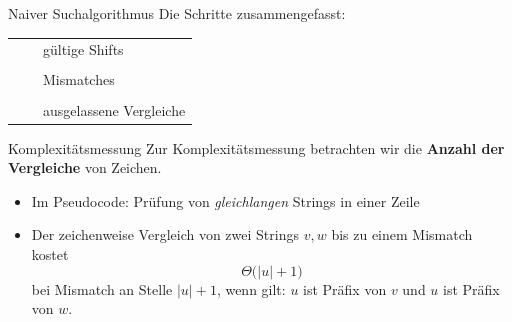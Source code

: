 \documentclass[xcolor=dvipsnames, aspectratio=1610]{beamer}
\begin{document}
\begin{frame}{Naiver Suchalgorithmus}
Die Schritte zusammengefasst:\bigskip

\begin{minipage}{.9\textwidth}
\begin{table}\setlength\extrarowheight{.3em}
\caption{Naiver Algorithmus, Beispiel}
\end{table}
\end{minipage}
\hspace{-4em}
\begin{minipage}{0.05\textwidth}
\tiny\vspace{-4em}
\begin{tabular}{cl}
\cellcolor{markgreen}~~& gültige Shifts\\\\[-.5em]
\cellcolor{red}~~& Mismatches\\\\[-.5em]
\cellcolor{lightgray}~~& ausgelassene Vergleiche
\end{tabular}
\end{minipage}
\end{frame}

\begin{frame}[<+->]{Komplexitätsmessung}
Zur Komplexitätsmessung betrachten wir die \textbf{Anzahl der Vergleiche} von Zeichen.\bigskip

\begin{itemize}
\item Im Pseudocode: Prüfung von \emph{gleichlangen} Strings in einer Zeile\bigskip
\item Der zeichenweise Vergleich von zwei Strings $v,w$ bis zu einem Mismatch kostet \[\Theta\big(\vert u\vert +1\big)\] bei Mismatch an Stelle $\vert u\vert +1$, wenn gilt: $u$ ist Präfix von $v$ und  $u$ ist Präfix von $w$.
\end{itemize}
\end{frame}
\end{document}
